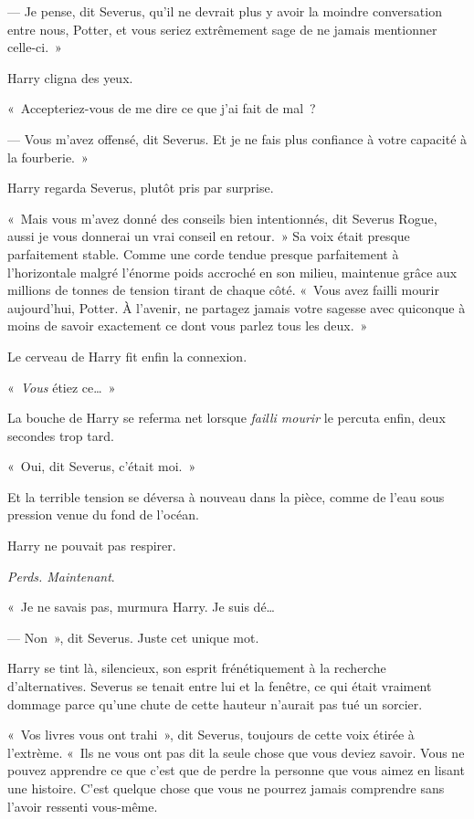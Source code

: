 --- Je pense, dit Severus, qu'il ne devrait plus y avoir la moindre conversation entre nous, Potter, et vous seriez extrêmement sage de ne jamais mentionner celle-ci.~»

Harry cligna des yeux.

«~Accepteriez-vous de me dire ce que j'ai fait de mal~?

--- Vous m'avez offensé, dit Severus. Et je ne fais plus confiance à votre capacité à la fourberie.~»

Harry regarda Severus, plutôt pris par surprise.

«~Mais vous m'avez donné des conseils bien intentionnés, dit Severus Rogue, aussi je vous donnerai un vrai conseil en retour.~» Sa voix était presque parfaitement stable. Comme une corde tendue presque parfaitement à l'horizontale malgré l'énorme poids accroché en son milieu, maintenue grâce aux millions de tonnes de tension tirant de chaque côté. «~Vous avez failli mourir aujourd'hui, Potter. À l'avenir, ne partagez jamais votre sagesse avec quiconque à moins de savoir exactement ce dont vous parlez tous les deux.~»

Le cerveau de Harry fit enfin la connexion.

«~\emph{Vous} étiez ce…~»

La bouche de Harry se referma net lorsque \emph{failli mourir} le percuta enfin, deux secondes trop tard.

«~Oui, dit Severus, c'était moi.~»

Et la terrible tension se déversa à nouveau dans la pièce, comme de l'eau sous pression venue du fond de l'océan.

Harry ne pouvait pas respirer.

\emph{Perds. Maintenant}.

«~Je ne savais pas, murmura Harry. Je suis dé…

--- Non~», dit Severus. Juste cet unique mot.

Harry se tint là, silencieux, son esprit frénétiquement à la recherche d'alternatives. Severus se tenait entre lui et la fenêtre, ce qui était vraiment dommage parce qu'une chute de cette hauteur n'aurait pas tué un sorcier.

«~Vos livres vous ont trahi~», dit Severus, toujours de cette voix étirée à l'extrème. «~Ils ne vous ont pas dit la seule chose que vous deviez savoir. Vous ne pouvez apprendre ce que c'est que de perdre la personne que vous aimez en lisant une histoire. C'est quelque chose que vous ne pourrez jamais comprendre sans l'avoir ressenti vous-même.

